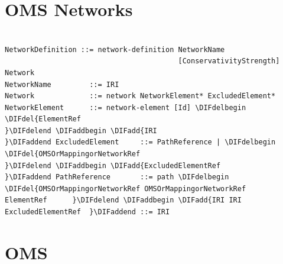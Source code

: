 \documentclass[10pt,fleqn,final]{scrreprt}
\makeatletter
\newcommand*{\eg}{e.g.\@\xspace}
\newcommand*\CommentAuthor{}
\renewcommand*\CommentAuthor{#1}}
\newcommand*\CommentDate{}
\renewcommand*\CommentDate{#1}}
\newcommand*\CommentId{}
\renewcommand*\CommentId{#1}}
\newcommand*\CommentType{}
\renewcommand*\CommentType{#1}}
\newcommand*{\SetCommentColorByType}[1]{%
\edef\localType{{#1}}%
\expandafter\ifstrequal\localType{q-aut}{\colorlet{CommentColor}{red}}{%
\expandafter\ifstrequal\localType{q-all}{\colorlet{CommentColor}{orange}}{%
\expandafter\ifstrequal\localType{todo}{\colorlet{CommentColor}{orange}}{%
\expandafter\ifstrequal\localType{fyi}{\colorlet{CommentColor}{lightgray}}{%
\colorlet{CommentColor}{yellow}}}}}}
\newcommand*{\SetCommentPrefixByType}[1]{%
\edef\localType{{#1}}%
\expandafter\@ifmtarg\localType{%
\edef\CommentPrefix{}%
}{%
\caseupper[q]{#1}%
\edef\CommentPrefix{\thestring: }%
}}
\newcommand*{\initComment}[1]{%
\setkeys{Comment}{#1}%
\SetCommentColorByType{\CommentType}%
\relax%
\SetCommentPrefixByType{\CommentType}%
\relax%
}
\newcommand*{\todonote}[2][]{%
\initComment{#1}%
\pdfcomment[author=\CommentAuthor,color=CommentColor,date=\CommentDate,id=\CommentId]{%
\CommentPrefix
#2}}
\renewcommand*{\todonote}[2][]{%
\initComment{#1}%
\ednote{\CommentPrefix #2}}
\renewcommand*{\textLF}{\\}
\newcommand{\sclause}[1]{\section{#1}}
\newenvironment{definitions}[0]{\medskip }{}
\providecommand{\DIFadd}[1]{{\protect\color{blue}\uwave{#1}}} %
\providecommand{\DIFdel}[1]{{\protect\color{red}\sout{#1}}}                      %
\providecommand{\DIFaddbegin}{} %
\providecommand{\DIFaddend}{} %
\providecommand{\DIFdelbegin}{} %
\providecommand{\DIFdelend}{} %
\makeatother
\begin{document}
\begin{definitions}


\sclause{OMS Networks}\label{a:networks}
\begin{lstlisting}[language=ebnf,escapeinside={()}]  % abstract syntax

NetworkDefinition ::= network-definition NetworkName
                                         [ConservativityStrength] Network
NetworkName         ::= IRI
Network             ::= network NetworkElement* ExcludedElement*
NetworkElement      ::= network-element [Id] \DIFdelbegin \DIFdel{ElementRef
}\DIFdelend \DIFaddbegin \DIFadd{IRI
}\DIFaddend ExcludedElement     ::= PathReference | \DIFdelbegin \DIFdel{OMSOrMappingorNetworkRef
}\DIFdelend \DIFaddbegin \DIFadd{ExcludedElementRef
}\DIFaddend PathReference       ::= path \DIFdelbegin \DIFdel{OMSOrMappingorNetworkRef OMSOrMappingorNetworkRef
ElementRef      }\DIFdelend \DIFaddbegin \DIFadd{IRI IRI
ExcludedElementRef  }\DIFaddend ::= IRI
\end{lstlisting}



\sclause{OMS}

\begin{lstlisting}[language=ebnf,escapeinside={()}]  % abstract syntax


\end{lstlisting}
\end{definitions}
\end{document}
